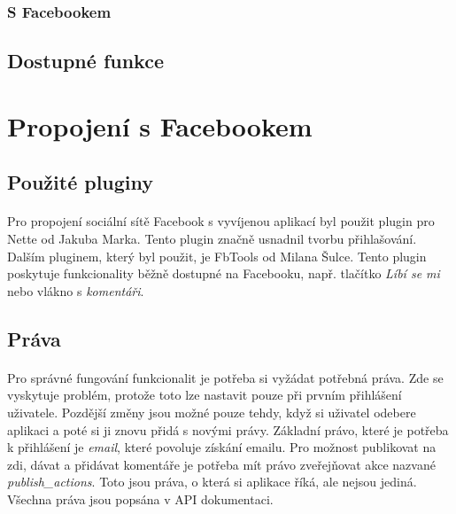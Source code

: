 \documentclass[11pt,a4paper,titlepage,oneside]{book}
\begin{document}
				\subsubsection{S Facebookem}
					\paragraph{} 
			\subsection{Dostupné funkce}
				\paragraph{}

		\section{Propojení s Facebookem}
			\subsection{Použité pluginy}
				\paragraph{} Pro propojení sociální sítě Facebook s vyvíjenou aplikací byl použit plugin pro Nette\cite{nette20login} od Jakuba Marka. Tento plugin značně usnadnil tvorbu přihlašování. Dalším pluginem, který byl použit, je FbTools\cite{FbTools} od Milana Šulce. Tento plugin poskytuje funkcionality běžně dostupné na Facebooku, např. tlačítko \textit{Líbí se mi} nebo vlákno s \textit{komentáři}.
			\subsection{Práva}
				\paragraph{} Pro správné fungování funkcionalit je potřeba si vyžádat potřebná  práva. Zde se vyskytuje problém, protože toto lze nastavit pouze při prvním přihlášení uživatele. Pozdější změny jsou možné pouze tehdy, když si uživatel odebere aplikaci a poté si ji znovu přidá s novými právy. Základní právo, které je potřeba k přihlášení je \textit{email}, které povoluje získání emailu. Pro možnost publikovat na zdi, dávat  a přidávat komentáře je potřeba mít právo zveřejňovat akce nazvané \textit{publish\_actions}. Toto jsou práva, o která si aplikace říká, ale nejsou jediná. Všechna práva jsou popsána v API dokumentaci\cite{FbApiPrava}.
\end{document}
